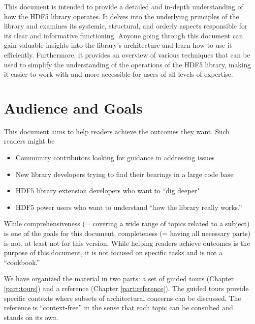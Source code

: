 

This document is intended to provide a detailed and in-depth understanding of how the HDF5 library operates. It delves into the underlying principles of the library and examines its systemic, structural, and orderly aspects responsible for its clear and informative functioning. Anyone going through this document can gain valuable insights into the library’s architecture and learn how to use it efficiently. Furthermore, it provides an overview of various techniques that can be used to simplify the understanding of the operations of the HDF5 library, making it easier to work with and more accessible for users of all levels of expertise.

\section{Audience and Goals}

This document aims to help readers achieve the outcomes they want. Such readers might be

\begin{itemize}
    \item Community contributors looking for guidance in addressing issues
    \item New library developers trying to find their bearings in a large code base
    \item HDF5 library extension developers who want to ``dig deeper"
    \item HDF5 power users who want to understand ``how the library really works.''
\end{itemize}

While comprehensiveness (= covering a wide range of topics related to a subject) is one of the goals for this document, completeness (= having all necessary parts) is not, at least not for this version. While helping readers achieve outcomes is the purpose of this document, it is not focused on specific tasks and is not a ``cookbook.''

We have organized the material in two parts: a set of guided tours (Chapter \ref{part:tours}) and a reference (Chapter \ref{part:reference}). The guided tours provide specific contexts where subsets of architectural concerns can be discussed. The reference is ``context-free'' in the sense that each topic can be consulted and stands on its own.

